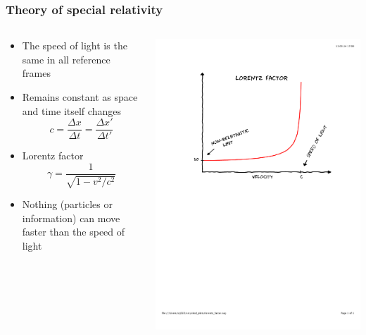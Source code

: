 \documentclass[mathserif,10pt]{beamer}
\begin{document}
\begin{frame}
    \frametitle{Theory of special relativity}
    \begin{columns}
    \begin{column}{.50\textwidth}
	\begin{itemize}
	\item The speed of light is the same in all reference frames
	\item Remains constant as space and time itself changes
	\begin{equation}
	    \nonumber
	    c = \frac{\Delta x}{\Delta t} = \frac{\Delta x'}{\Delta t'}
	\end{equation}
	\item Lorentz factor
	\begin{equation}
	    \nonumber
	    \gamma = \frac{1}{\sqrt{1-v^2/c^2}}
	\end{equation}
	\item Nothing (particles or information) can move faster than the speed of light
	\end{itemize}
    \end{column}
    \begin{column}{.50\textwidth}
	\centering
	\includegraphics[viewport = 100 400 550 750, clip, scale=0.3]{figures/lorentz_factor.pdf}\\

\end{column}
\end{columns}
\end{frame}
\end{document}

